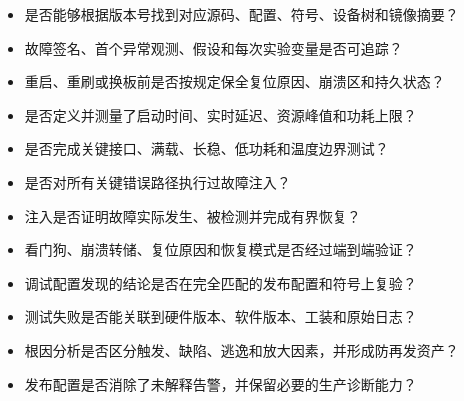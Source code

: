 \begin{itemize}
  \item 是否能够根据版本号找到对应源码、配置、符号、设备树和镜像摘要？
  \item 故障签名、首个异常观测、假设和每次实验变量是否可追踪？
  \item 重启、重刷或换板前是否按规定保全复位原因、崩溃区和持久状态？
  \item 是否定义并测量了启动时间、实时延迟、资源峰值和功耗上限？
  \item 是否完成关键接口、满载、长稳、低功耗和温度边界测试？
  \item 是否对所有关键错误路径执行过故障注入？
  \item 注入是否证明故障实际发生、被检测并完成有界恢复？
  \item 看门狗、崩溃转储、复位原因和恢复模式是否经过端到端验证？
  \item 调试配置发现的结论是否在完全匹配的发布配置和符号上复验？
  \item 测试失败是否能关联到硬件版本、软件版本、工装和原始日志？
  \item 根因分析是否区分触发、缺陷、逃逸和放大因素，并形成防再发资产？
  \item 发布配置是否消除了未解释告警，并保留必要的生产诊断能力？
\end{itemize}
